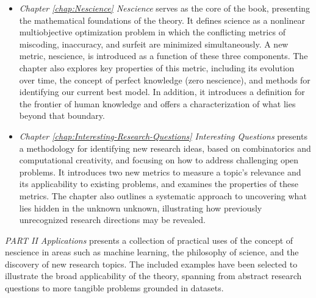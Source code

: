 \begin{itemize}

\item \emph{Chapter \ref{chap:Nescience} Nescience} serves as the core of the book, presenting the mathematical foundations of the theory. It defines science as a nonlinear multiobjective optimization problem in which the conflicting metrics of miscoding, inaccuracy, and surfeit are minimized simultaneously. A new metric, nescience, is introduced as a function of these three components. The chapter also explores key properties of this metric, including its evolution over time, the concept of perfect knowledge (zero nescience), and methods for identifying our current best model. In addition, it introduces a definition for the frontier of human knowledge and offers a characterization of what lies beyond that boundary.

\item \emph{Chapter \ref{chap:Interesting-Research-Questions} Interesting Questions} presents a methodology for identifying new research ideas, based on combinatorics and computational creativity, and focusing on how to address challenging open problems. It introduces two new metrics to measure a topic's relevance and its applicability to existing problems, and examines the properties of these metrics. The chapter also outlines a systematic approach to uncovering what lies hidden in the unknown unknown, illustrating how previously unrecognized research directions may be revealed.

\end{itemize}

\bigskip

\emph{PART II Applications} presents a collection of practical uses of the concept of nescience in areas such as machine learning, the philosophy of science, and the discovery of new research topics. The included examples have been selected to illustrate the broad applicability of the theory, spanning from abstract research questions to more tangible problems grounded in datasets.

